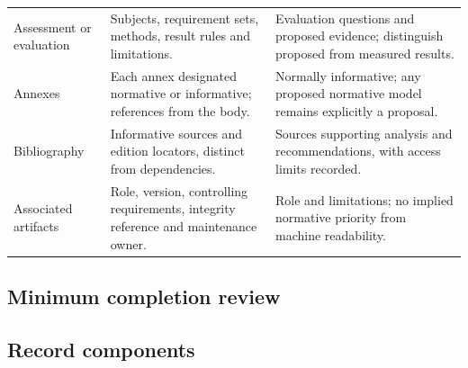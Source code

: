 \documentclass[11pt,a4paper]{article}
\begin{document}
\begin{longtable}{L{0.22\textwidth}L{0.35\textwidth}L{0.35\textwidth}}
Assessment or evaluation & Subjects, requirement sets, methods, result rules and limitations. & Evaluation questions and proposed evidence; distinguish proposed from measured results.\\
Annexes & Each annex designated normative or informative; references from the body. & Normally informative; any proposed normative model remains explicitly a proposal.\\
Bibliography & Informative sources and edition locators, distinct from dependencies. & Sources supporting analysis and recommendations, with access limits recorded.\\
Associated artifacts & Role, version, controlling requirements, integrity reference and maintenance owner. & Role and limitations; no implied normative priority from machine readability.\\
\bottomrule
\end{longtable}

\subsection{Minimum completion review}

\label{ann:assessment}
\subsection{Record components}
\end{document}
